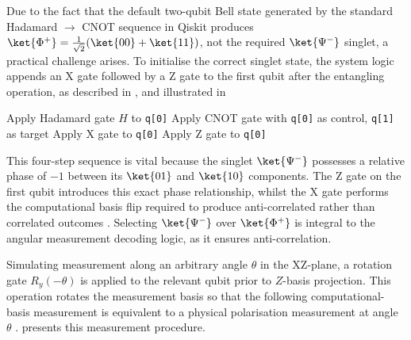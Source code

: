 Due to the fact that the default two-qubit Bell state generated by the standard Hadamard $\rightarrow$ CNOT sequence in Qiskit produces $\ket{\Phi^+} = \frac{1}{\sqrt{2}}(\ket{00} + \ket{11})$, not the required $\ket{\Psi^-}$ singlet, a practical challenge arises. To initialise the correct singlet state, the system logic appends an X gate followed by a Z gate to the first qubit after the entangling operation, as described in , and illustrated in 

\begin{algorithm}[H]
    \caption{E91 Singlet State Preparation}\label{alg:e91_prep}
    Apply Hadamard gate $H$ to \texttt{q[0]}\; 
    Apply CNOT gate with \texttt{q[0]} as control, \texttt{q[1]} as target\; 
    Apply X gate to \texttt{q[0]}\; 
    Apply Z gate to \texttt{q[0]}\; 
\end{algorithm}

This four-step sequence is vital because the singlet $\ket{\Psi^-}$ possesses a relative phase of $-1$ between its $\ket{01}$ and $\ket{10}$ components. The Z gate on the first qubit introduces this exact phase relationship, whilst the X gate performs the computational basis flip required to produce anti-correlated rather than correlated outcomes \cite{QiskitAer}. Selecting $\ket{\Psi^-}$ over $\ket{\Phi^+}$ is integral to the angular measurement decoding logic, as it ensures anti-correlation.

Simulating measurement along an arbitrary angle $\theta$ in the XZ-plane, a rotation gate $R_y(-\theta)$ is applied to the relevant qubit prior to $Z$-basis projection. This operation rotates the measurement basis so that the following computational-basis measurement is equivalent to a physical polarisation measurement at angle $\theta$ \cite{e91Qiskit}.  presents this measurement procedure.

